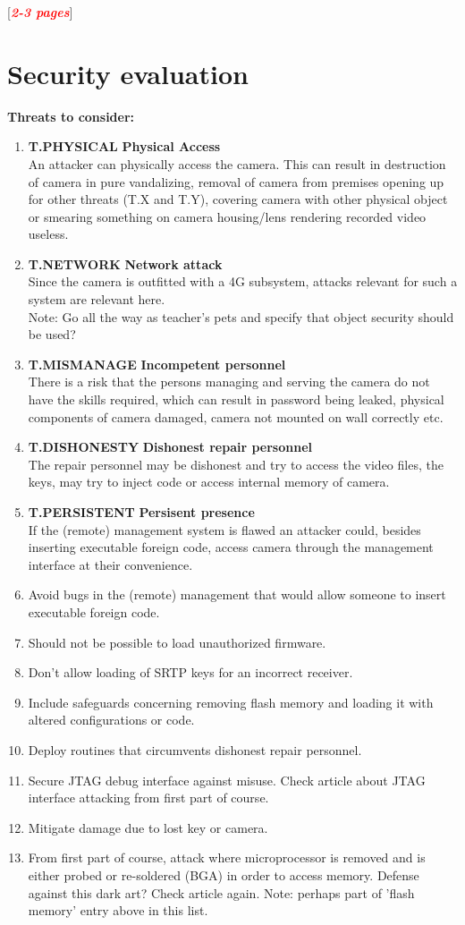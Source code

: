 \documentclass[10pt]{article}
\newcommand{\todo}[1]{
  \begin{center}
    [\textcolor{red}{\textbf{\textit{#1}}}]
  \end{center}
}
\newcommand{\threat}[3]{\item{\textbf{T.#1} \hfill \textbf{#2} \\ #3}}
\begin{document}
    \todo{2-3 pages}

  \section{Security evaluation}

  \textbf{Threats to consider:}
  \begin{enumerate}
    \threat{PHYSICAL}{Physical Access} {
	An attacker can physically access the camera. This can result in destruction of camera in pure vandalizing, removal of camera from premises opening up for other threats (T.X and T.Y), 
	covering camera with other physical object or smearing something on camera housing/lens rendering recorded video useless. }
    \threat{NETWORK}{Network attack} {
	Since the camera is outfitted with a 4G subsystem, attacks relevant for such a system are relevant here. \\
	Note: Go all the way as teacher's pets and specify that object security should be used?}
    \threat{MISMANAGE}{Incompetent personnel} {
	There is a risk that the persons managing and serving the camera do not have the skills required, which can result in password being leaked, physical components of camera damaged, camera not mounted on wall correctly etc.}
    \threat{DISHONESTY}{Dishonest repair personnel}{ %
	The repair personnel may be dishonest and try to access the video files, the keys, may try to inject code or access internal memory of camera.}
    \threat{PERSISTENT}{Persisent presence}{
	If the (remote) management system is flawed an attacker could, besides inserting executable foreign code, access camera through the management interface at their convenience.}

    \item{Avoid bugs in the (remote) management that would allow someone to
      insert executable foreign code.}
    \item{Should not be possible to load unauthorized firmware.}
    \item{Don't allow loading of SRTP keys for an incorrect receiver.}
    \item{Include safeguards concerning removing flash memory and loading it
      with altered configurations or code.}
    \item{Deploy routines that circumvents dishonest repair personnel.}
    \item{Secure JTAG debug interface against misuse. Check article about JTAG interface attacking from first part of course.}
    \item{Mitigate damage due to lost key or camera.}
    \item{From first part of course, attack where microprocessor is removed and is either probed or re-soldered (BGA) in order to access memory. Defense against this dark art? Check article again. Note: perhaps part of 'flash memory' entry above in this list.}
  \end{enumerate}
\end{document}
